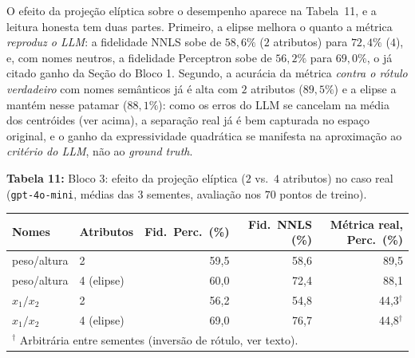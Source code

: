 \documentclass[12pt,a4paper]{article}
\begin{document}
\bigskip


O efeito da projeção elíptica sobre o desempenho aparece na
Tabela~11, e a leitura honesta tem duas partes. Primeiro, a elipse
melhora o quanto a métrica \emph{reproduz o LLM}: a fidelidade NNLS sobe de $58{,}6\%$
($2$ atributos) para $72{,}4\%$ ($4$), e, com nomes neutros, a fidelidade Perceptron sobe
de $56{,}2\%$ para $69{,}0\%$, o já citado ganho da Seção do Bloco 1. Segundo, a acurácia
da métrica \emph{contra o rótulo verdadeiro} com nomes semânticos já é alta com $2$
atributos ($89{,}5\%$) e a elipse a mantém nesse patamar ($88{,}1\%$): como os erros do
LLM se cancelam na média dos centróides (ver acima), a separação real já é bem capturada
no espaço original, e o ganho da expressividade quadrática se manifesta na aproximação ao
\emph{critério do LLM}, não ao \emph{ground truth}.


\bigskip

\noindent \textbf{Tabela 11:} Bloco 3: efeito da projeção elíptica ($2$ vs.\ $4$ atributos) no caso real
(\texttt{gpt-4o-mini}, médias das $3$ sementes, avaliação nos $70$ pontos de treino).

\begin{tabular}{llrrr}
\toprule
\textbf{Nomes} & \textbf{Atributos} & \textbf{Fid.\ Perc.\ (\%)} &
\textbf{Fid.\ NNLS (\%)} & \textbf{Métrica real, Perc.\ (\%)} \\
\midrule
peso/altura & 2 & 59,5 & 58,6 & 89,5 \\
peso/altura & 4 (elipse) & 60,0 & 72,4 & 88,1 \\
$x_1/x_2$   & 2 & 56,2 & 54,8 & 44,3$^\dagger$ \\
$x_1/x_2$   & 4 (elipse) & 69,0 & 76,7 & 44,8$^\dagger$ \\
\bottomrule
\multicolumn{5}{l}{\footnotesize $^\dagger$ Arbitrária entre sementes (inversão de
rótulo, ver texto).}
\end{tabular}

\bigskip
\end{document}
